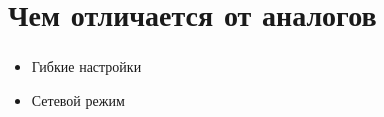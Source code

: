 \section{Чем отличается от аналогов}

\begin{frame}
\frametitle{\insertsection} 

\begin{itemize}
    \item Гибкие настройки
    \item Сетевой режим
\end{itemize}

\end{frame}